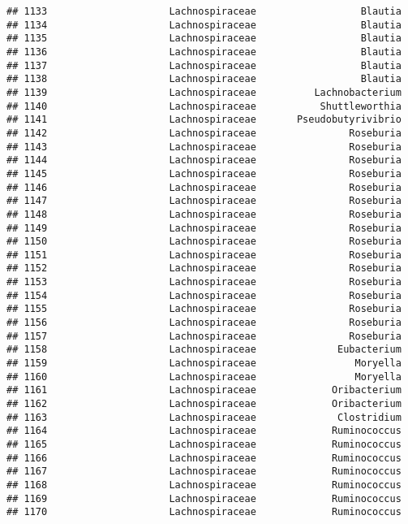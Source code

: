 \documentclass[
]{article}
\begin{document}
\begin{verbatim}
## 1133                     Lachnospiraceae                  Blautia
## 1134                     Lachnospiraceae                  Blautia
## 1135                     Lachnospiraceae                  Blautia
## 1136                     Lachnospiraceae                  Blautia
## 1137                     Lachnospiraceae                  Blautia
## 1138                     Lachnospiraceae                  Blautia
## 1139                     Lachnospiraceae          Lachnobacterium
## 1140                     Lachnospiraceae           Shuttleworthia
## 1141                     Lachnospiraceae       Pseudobutyrivibrio
## 1142                     Lachnospiraceae                Roseburia
## 1143                     Lachnospiraceae                Roseburia
## 1144                     Lachnospiraceae                Roseburia
## 1145                     Lachnospiraceae                Roseburia
## 1146                     Lachnospiraceae                Roseburia
## 1147                     Lachnospiraceae                Roseburia
## 1148                     Lachnospiraceae                Roseburia
## 1149                     Lachnospiraceae                Roseburia
## 1150                     Lachnospiraceae                Roseburia
## 1151                     Lachnospiraceae                Roseburia
## 1152                     Lachnospiraceae                Roseburia
## 1153                     Lachnospiraceae                Roseburia
## 1154                     Lachnospiraceae                Roseburia
## 1155                     Lachnospiraceae                Roseburia
## 1156                     Lachnospiraceae                Roseburia
## 1157                     Lachnospiraceae                Roseburia
## 1158                     Lachnospiraceae              Eubacterium
## 1159                     Lachnospiraceae                 Moryella
## 1160                     Lachnospiraceae                 Moryella
## 1161                     Lachnospiraceae             Oribacterium
## 1162                     Lachnospiraceae             Oribacterium
## 1163                     Lachnospiraceae              Clostridium
## 1164                     Lachnospiraceae             Ruminococcus
## 1165                     Lachnospiraceae             Ruminococcus
## 1166                     Lachnospiraceae             Ruminococcus
## 1167                     Lachnospiraceae             Ruminococcus
## 1168                     Lachnospiraceae             Ruminococcus
## 1169                     Lachnospiraceae             Ruminococcus
## 1170                     Lachnospiraceae             Ruminococcus

\end{verbatim}
\end{document}
